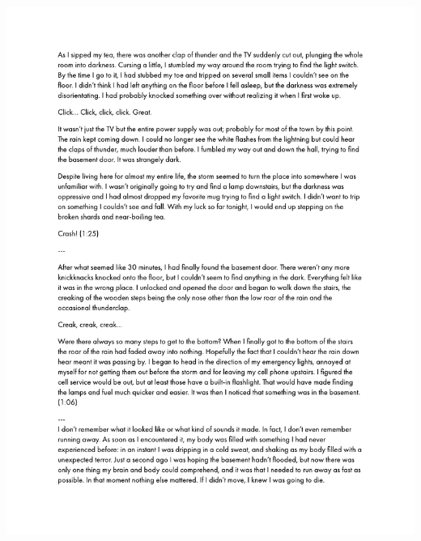 \begin{center}
     \includegraphics[scale=0.75]{Scores/raindrops_Part20.pdf}
\end{center}
\newpage
